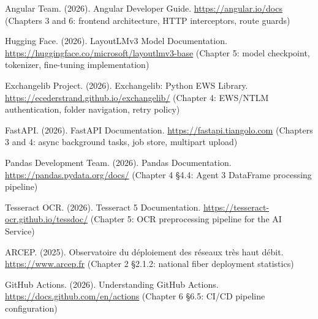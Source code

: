 Angular Team. (2026). Angular Developer Guide. \url{https://angular.io/docs} (Chapters 3 and 6: frontend architecture, HTTP interceptors, route guards)

Hugging Face. (2026). LayoutLMv3 Model Documentation. \url{https://huggingface.co/microsoft/layoutlmv3-base} (Chapter 5: model checkpoint, tokenizer, fine-tuning implementation)

Exchangelib Project. (2026). Exchangelib: Python EWS Library. \url{https://ecederstrand.github.io/exchangelib/} (Chapter 4: EWS/NTLM authentication, folder navigation, retry policy)

FastAPI. (2026). FastAPI Documentation. \url{https://fastapi.tiangolo.com} (Chapters 3 and 4: async background tasks, job store, multipart upload)

Pandas Development Team. (2026). Pandas Documentation. \url{https://pandas.pydata.org/docs/} (Chapter 4 \S{}4.4: Agent 3 DataFrame processing pipeline)

Tesseract OCR. (2026). Tesseract 5 Documentation. \url{https://tesseract-ocr.github.io/tessdoc/} (Chapter 5: OCR preprocessing pipeline for the AI Service)

ARCEP. (2025). Observatoire du déploiement des réseaux très haut débit. \url{https://www.arcep.fr} (Chapter 2 \S{}2.1.2: national fiber deployment statistics)

GitHub Actions. (2026). Understanding GitHub Actions. \url{https://docs.github.com/en/actions} (Chapter 6 \S{}6.5: CI/CD pipeline configuration)
